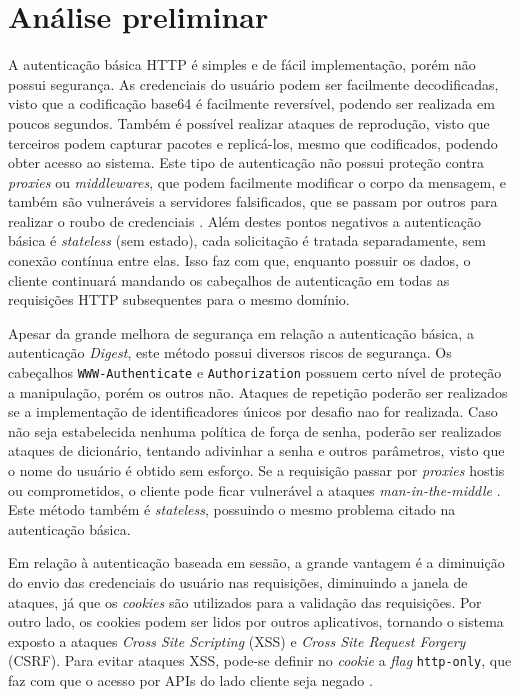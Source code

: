 \section{Análise preliminar}

A autenticação básica HTTP é simples e de fácil implementação, porém não possui segurança. As 
credenciais do usuário podem ser facilmente decodificadas, visto que a codificação base64 é 
facilmente reversível, podendo ser realizada em poucos segundos. Também é possível realizar ataques 
de reprodução, visto que terceiros podem capturar pacotes e replicá-los, mesmo que codificados, 
podendo obter acesso ao sistema. Este tipo de autenticação não possui proteção contra \emph{proxies} 
ou \emph{middlewares}, que podem facilmente modificar o corpo da mensagem, e também são vulneráveis 
a servidores falsificados, que se passam por outros para realizar o roubo de credenciais 
\cite{GOURLEY2002}. Além destes pontos negativos a autenticação básica é \emph{stateless} (sem 
estado), cada solicitação é tratada separadamente, sem conexão contínua entre elas. Isso faz com 
que, enquanto possuir os dados, o cliente continuará mandando os cabeçalhos de autenticação em 
todas as requisições HTTP subsequentes para o mesmo domínio.

Apesar da grande melhora de segurança em relação a autenticação básica, a autenticação 
\emph{Digest}, este método possui diversos riscos de segurança. Os cabeçalhos 
\texttt{WWW-Authenticate} e \texttt{Authorization} possuem certo nível de proteção a manipulação, 
porém os outros não. Ataques de repetição poderão ser realizados se a implementação de 
identificadores únicos por desafio nao for realizada. Caso não seja estabelecida nenhuma política de 
força de senha, poderão ser realizados ataques de dicionário, tentando adivinhar a senha e outros 
parâmetros, visto que o nome do usuário é obtido sem esforço. Se a requisição passar por 
\emph{proxies} hostis ou comprometidos, o cliente pode ficar vulnerável a ataques 
\emph{man-in-the-middle} \cite{GOURLEY2002}. Este método também é \emph{stateless}, possuindo o 
mesmo problema citado na autenticação básica.

Em relação à autenticação baseada em sessão, a grande vantagem é a diminuição do envio das 
credenciais do usuário nas requisições, diminuindo a janela de ataques, já que os \emph{cookies} 
são utilizados para a validação das requisições. Por outro lado, os cookies podem ser lidos por 
outros aplicativos, tornando o sistema exposto a ataques \emph{Cross Site Scripting} (XSS) e 
\emph{Cross Site Request Forgery} (CSRF). Para evitar ataques XSS, pode-se definir no \emph{cookie} 
a \emph{flag} \texttt{http-only}, que faz com que o acesso por APIs do lado cliente seja negado 
\cite{PAPATHANASAKI2022}.

